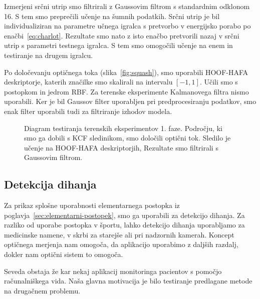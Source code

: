 Izmerjeni srčni utrip smo filtrirali z Gaussovim filtrom s standardnim odklonom \num{16}. S tem smo preprečili učenje na šumnih podatkih. Srčni utrip je bil individualiziran na parametre učnega igralca s pretvorbo v energijsko porabo po enačbi~\eqref{eq:charlot}. Rezultate smo nato z isto enačbo pretvorili nazaj v srčni utrip s parametri testnega igralca. S tem smo omogočili učenje na enem in testiranje na drugem igralcu. 

Po določevanju optičnega toka (slika~\ref{fig:squash}), smo uporabili HOOF-HAFA deskriptorje, katerih značilke smo skalirali na intervalu $[-1,1]$. Učili smo s postopkom \esvr in jedrom RBF. Za terenske eksperimente Kalmanovega filtra nismo uporabili. Ker je bil Gaussov filter uporabljen pri predprocesiranju podatkov, smo enak filter uporabili tudi za filtriranje izhodov modela.

\begin{figure}[!htb]
	\centering
	\resizebox{\columnwidth}{!}{}
	\caption[Diagram testiranja terenskih eksperimentov 1. faze]{Diagram testiranja terenskih eksperimentov 1. faze. Področju, ki smo ga dobili s KCF sledinikom, smo določili optični tok. Sledilo je učenje na HOOF-HAFA deskriptorjih, Rezultate smo filtrirali s Gaussovim filtrom.}
	\label{fig:diagram-procesiranja-field-stag1}
\end{figure}

















\subsection{Detekcija dihanja}
Za prikaz splošne uporabnosti elementarnega postopka iz poglavja~\ref{sec:elementarni-postopek}, smo ga uporabili za detekcijo dihanja. Za razliko od uporabe postopka v športu, lahko detekcijo dihanja uporabljamo za medicinske namene, v skrbi za starejše ali pri nadzornih kamerah. Koncept optičnega merjenja nam omogoča, da aplikacijo uporabimo z daljših razdalj, dokler nam optični sistem to omogoča. 

Seveda obstaja že kar nekaj aplikacij monitoringa pacientov s pomočjo računalniškega vida. Naša glavna motivacija je bilo testiranje predlagane metode na drugačnem problemu.

